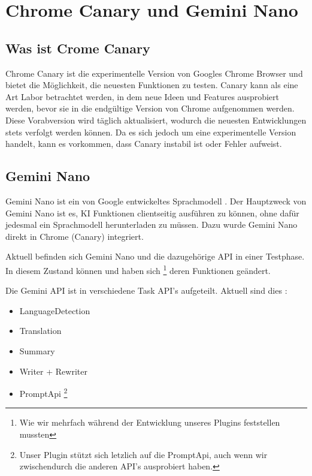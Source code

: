 \section{Chrome Canary und Gemini Nano}

\subsection{Was ist Crome Canary}

Chrome Canary ist die experimentelle Version von Googles Chrome Browser und bietet die Möglichkeit, die neuesten Funktionen zu testen. Canary kann als eine Art Labor betrachtet werden, in dem neue Ideen und Features ausprobiert werden, bevor sie in die endgültige Version von Chrome aufgenommen werden. Diese Vorabversion wird täglich aktualisiert, wodurch die neuesten Entwicklungen stets verfolgt werden können. Da es sich jedoch um eine experimentelle Version handelt, kann es vorkommen, dass Canary instabil ist oder Fehler aufweist. \cite{chrome-canary}

\subsection{Gemini Nano}

Gemini Nano ist ein von Google entwickeltes Sprachmodell \cite{gemini-nano}. Der Hauptzweck von Gemini Nano ist es, KI Funktionen clientseitig ausführen zu können, ohne dafür jedesmal ein Sprachmodell herunterladen zu müssen. Dazu wurde Gemini Nano direkt in Chrome (Canary) integriert. \cite{gemini-nano-build-in-ai}

Aktuell befinden sich Gemini Nano und die dazugehörige API in einer Testphase. In diesem Zustand können und haben sich \footnote{Wie wir mehrfach während der Entwicklung unseres Plugins feststellen mussten} deren Funktionen geändert. \cite{gemini-nano-build-in-ai}

Die Gemini API ist in verschiedene Task API's aufgeteilt. Aktuell sind dies \cite{gemini-nano-apis}:
\begin{itemize}
    \item LanguageDetection
    \item Translation
    \item Summary
    \item Writer + Rewriter
    \item PromptApi \footnote{Unser Plugin stützt sich letzlich auf die PromptApi, auch wenn wir zwischendurch die anderen API's ausprobiert haben.}
\end{itemize} 

